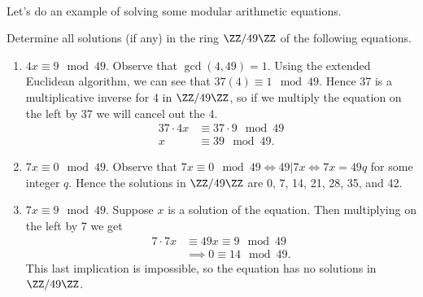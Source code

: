 \documentclass[../abstract_algebra.tex]{subfiles}
\begin{document}
        \paragraph{}
        Let's do an example of solving some modular arithmetic equations.
        \begin{example}
            Determine all solutions (if any) in the ring $\ZZ/49\ZZ$ of the following equations.
            \begin{enumerate}[label={\upshape(\roman*)}]
                \item $4x\equiv 9\mod 49$.
                Observe that $\gcd(4,49)=1$. Using the extended Euclidean algorithm, we can see that $37(4)\equiv 1\mod49$.
                Hence 37 is a multiplicative inverse for 4 in $\ZZ/49\ZZ$, so if we multiply the equation on the left by 37 we will cancel out the 4.
                \begin{align}
                    37\cdot 4x&\equiv 37\cdot 9\mod 49\\
                    x&\equiv 39\mod 49.
                \end{align}
                \item $7x\equiv 0\mod 49$.
                Observe that $7x\equiv 0\mod 49\iff 49|7x\iff 7x=49q$ for some integer $q$.
                Hence the solutions in $\ZZ/49\ZZ$ are 0, 7, 14, 21, 28, 35, and 42.
                \item $7x\equiv 9\mod 49$.
                Suppose $x$ is a solution of the equation.
                Then multiplying on the left by 7 we get
                \begin{align}
                    7\cdot 7x&\equiv 49x\equiv 9\mod 49\\
                    &\implies 0\equiv 14\mod 49.
                \end{align}
                This last implication is impossible, so the equation has no solutions in $\ZZ/49\ZZ$.
            \end{enumerate}
        \end{example}
\end{document}
